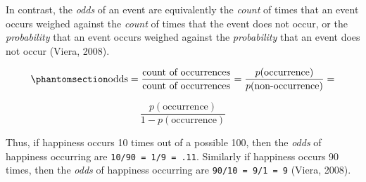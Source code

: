 \documentclass[
  letterpaper,
  DIV=11,
  numbers=noendperiod]{scrreprt}
\begin{document}
In contrast, the \emph{odds} of an event are equivalently the
\emph{count} of times that an event occurs weighed against the
\emph{count} of times that the event does not occur, or the
\emph{probability} that an event occurs weighed against the
\emph{probability} that an event does not occur (Viera, 2008).

\begin{equation}\phantomsection\label{eq-odds-definition}{\text{odds} = \frac{\text{count of occurrences}}{\text{count of occurrences}} = \frac{p(\text{occurrence})}{p(\text{non-occurrence})} =}\end{equation}

\[\frac{p(\text{occurrence})}{1-p(\text{occurrence})}\]

Thus, if happiness occurs 10 times out of a possible 100, then the
\emph{odds} of happiness occurring are \texttt{10/90\ =\ 1/9\ =\ .11}.
Similarly if happiness occurs 90 times, then the \emph{odds} of
happiness occurring are \texttt{90/10\ =\ 9/1\ =\ 9} (Viera, 2008).
\end{document}
